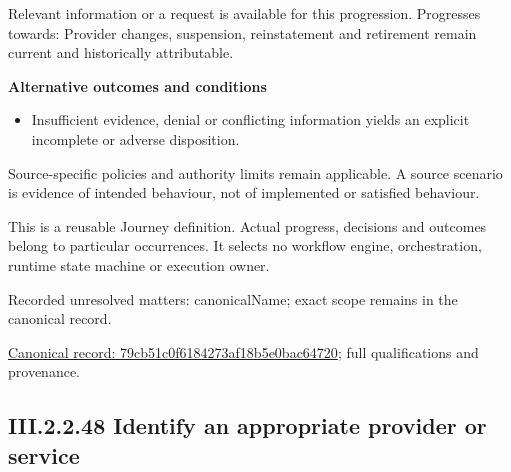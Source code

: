 Relevant information or a request is available for this progression. Progresses towards: Provider changes, suspension, reinstatement and retirement remain current and historically attributable.



\par\medskip\textbf{Alternative outcomes and conditions}\par


\begin{itemize}


\item Insufficient evidence, denial or conflicting information yields an explicit incomplete or adverse disposition.

\end{itemize}


Source-specific policies and authority limits remain applicable. A source scenario is evidence of intended behaviour, not of implemented or satisfied behaviour.



This is a reusable Journey definition. Actual progress, decisions and outcomes belong to particular occurrences. It selects no workflow engine, orchestration, runtime state machine or execution owner.


{\small Recorded unresolved matters: canonicalName; exact scope remains in the canonical record.}\par
{\footnotesize \href{../../../../../../../continuum/strategy/value-stream/79cb51c0f6184273af18b5e0bac64720.md}{Canonical record: 79cb51c0f6184273af18b5e0bac64720}; full qualifications and provenance.}\par
\subsection*{III.2.2.48 Identify an appropriate provider or service}
\label{navigation:III.2.2.48}

